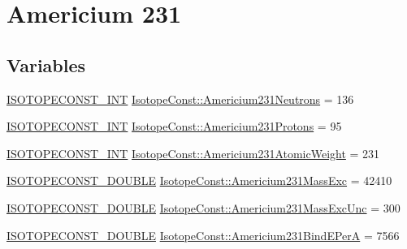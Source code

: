 \hypertarget{group___isotope_const-_americium-_am231}{}\section{Americium 231}
\label{group___isotope_const-_americium-_am231}
\subsection*{Variables}
\begin{DoxyCompactItemize}
\item 
\mbox{\hyperlink{group___isotope_const-_macros_ga5f18360b3e99483a35c32d789e62621c}{I\+S\+O\+T\+O\+P\+E\+C\+O\+N\+S\+T\+\_\+\+I\+NT}} \mbox{\hyperlink{group___isotope_const-_americium-_am231_gab8016912718298fb2973714bb2129887}{Isotope\+Const\+::\+Americium231\+Neutrons}} = 136
\item 
\mbox{\hyperlink{group___isotope_const-_macros_ga5f18360b3e99483a35c32d789e62621c}{I\+S\+O\+T\+O\+P\+E\+C\+O\+N\+S\+T\+\_\+\+I\+NT}} \mbox{\hyperlink{group___isotope_const-_americium-_am231_ga042ba4e85ed0a8a0995b31194f36216c}{Isotope\+Const\+::\+Americium231\+Protons}} = 95
\item 
\mbox{\hyperlink{group___isotope_const-_macros_ga5f18360b3e99483a35c32d789e62621c}{I\+S\+O\+T\+O\+P\+E\+C\+O\+N\+S\+T\+\_\+\+I\+NT}} \mbox{\hyperlink{group___isotope_const-_americium-_am231_ga481dd87b0a910696373e7e2faeb8caf4}{Isotope\+Const\+::\+Americium231\+Atomic\+Weight}} = 231
\item 
\mbox{\hyperlink{group___isotope_const-_macros_ga8f45a7272ce02c0b4c65c44636ed719a}{I\+S\+O\+T\+O\+P\+E\+C\+O\+N\+S\+T\+\_\+\+D\+O\+U\+B\+LE}} \mbox{\hyperlink{group___isotope_const-_americium-_am231_ga78161990eee1c8cc41ab1358e1c6014d}{Isotope\+Const\+::\+Americium231\+Mass\+Exc}} = 42410
\item 
\mbox{\hyperlink{group___isotope_const-_macros_ga8f45a7272ce02c0b4c65c44636ed719a}{I\+S\+O\+T\+O\+P\+E\+C\+O\+N\+S\+T\+\_\+\+D\+O\+U\+B\+LE}} \mbox{\hyperlink{group___isotope_const-_americium-_am231_ga93e18490916450c84f618df47ec4698a}{Isotope\+Const\+::\+Americium231\+Mass\+Exc\+Unc}} = 300
\item 
\mbox{\hyperlink{group___isotope_const-_macros_ga8f45a7272ce02c0b4c65c44636ed719a}{I\+S\+O\+T\+O\+P\+E\+C\+O\+N\+S\+T\+\_\+\+D\+O\+U\+B\+LE}} \mbox{\hyperlink{group___isotope_const-_americium-_am231_ga1182dd0b637b165df45fbe90af9ce3c0}{Isotope\+Const\+::\+Americium231\+Bind\+E\+PerA}} = 7566
\item 

\end{DoxyCompactItemize}
